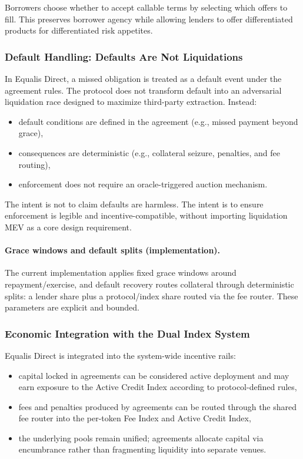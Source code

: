 \documentclass[version=preprint]{iacrcc}
\begin{document}
Borrowers choose whether to accept callable terms by selecting which offers to fill. This preserves borrower agency while allowing lenders to offer differentiated products for differentiated risk appetites.

\subsubsection{Default Handling: Defaults Are Not Liquidations}

In Equalis Direct, a missed obligation is treated as a default event under the agreement rules. The protocol does not transform default into an adversarial liquidation race designed to maximize third-party extraction. Instead:
\begin{itemize}
  \item default conditions are defined in the agreement (e.g., missed payment beyond grace),
  \item consequences are deterministic (e.g., collateral seizure, penalties, and fee routing),
  \item enforcement does not require an oracle-triggered auction mechanism.
\end{itemize}

The intent is not to claim defaults are harmless. The intent is to ensure enforcement is legible and incentive-compatible, without importing liquidation MEV as a core design requirement.

\paragraph{Grace windows and default splits (implementation).}
The current implementation applies fixed grace windows around repayment/exercise, and default recovery routes collateral through deterministic splits: a lender share plus a protocol/index share routed via the fee router. These parameters are explicit and bounded.

\subsubsection{Economic Integration with the Dual Index System}

Equalis Direct is integrated into the system-wide incentive rails:
\begin{itemize}
  \item capital locked in agreements can be considered active deployment and may earn exposure to the Active Credit Index according to protocol-defined rules,
  \item fees and penalties produced by agreements can be routed through the shared fee router into the per-token Fee Index and Active Credit Index,
  \item the underlying pools remain unified; agreements allocate capital via encumbrance rather than fragmenting liquidity into separate venues.
\end{itemize}
\end{document}
